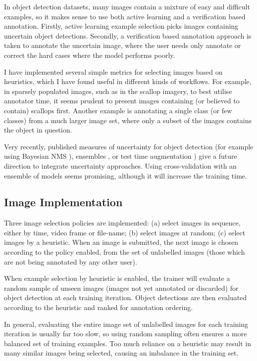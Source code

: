 In object detection datasets, many images contain a mixture of easy and difficult examples, so it makes sense to use both active learning and a verification based annotation.  Firstly, active learning example selection picks images containing uncertain object detections. Secondly, a verification based annotation approach is taken to annotate the uncertain image, where the user needs only annotate or correct the hard cases where the model performs poorly.

I have implemented several simple metrics for selecting images based on heuristics, which I have found useful in different kinds of workflows. For example, in sparsely populated images, such as in the scallop imagery, to best utilise annotator time, it seems prudent to present images containing (or believed to contain) scallops first. Another example is annotating a single class (or few classes) from a much larger image set, where only a subset of the images contains the object in question.

Very recently, published measures of uncertainty for object detection (for example using Bayesian \gls{NMS} \cite{Harakeh}), ensembles \cite{Le2018}, or test time augmentation \cite{Wei2018}) give a future direction to integrate uncertainty approaches. Using cross-validation with an ensemble of models seems promising, although it will increase the training time.

\subsection {Image Implementation}
\label{sec:example_implementation}

Three image selection policies are implemented: (a) select images in sequence, either by time, video frame or file-name; (b) select images at random; (c) select images by a heuristic. When an image is submitted, the next image is chosen according to the policy enabled, from the set of unlabelled images (those which are not being annotated by any other user).

When example selection by heuristic is enabled, the trainer will evaluate a random sample of unseen images (images not yet annotated or discarded) for object detection at each training iteration. Object detections are then evaluated according to the heuristic and ranked for annotation ordering. 

In general, evaluating the entire image set of unlabelled images for each training iteration is usually far too slow, so using random sampling often ensures a more balanced set of training examples. Too much reliance on a heuristic may result in many similar images being selected, causing an imbalance in the training set.

